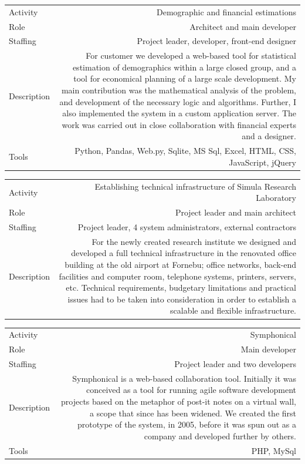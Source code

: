 \documentclass[english,a4paper,11pt]{article}
\begin{document}
\begin{tabular}{@{}LR}
Activity & Demographic and financial estimations \\ 
Role & Architect and main developer \\ 
Staffing & Project leader, developer, front-end designer \\ 
Description & For customer we developed a web-based tool for statistical estimation of demographics within a large closed group, and a tool for economical planning of a large scale development. My main contribution was the mathematical analysis of the problem, and development of the necessary logic and algorithms. Further, I also implemented the system in a custom application server. The work was carried out in close collaboration with financial experts and a designer. \\ 
Tools & Python, Pandas, Web.py, Sqlite, MS Sql, Excel, HTML, CSS, JavaScript, jQuery \\ 
\end{tabular}

\begin{tabular}{@{}LR}
Activity & Establishing technical infrastructure of Simula Research Laboratory \\ 
Role & Project leader and main architect \\ 
Staffing & Project leader, 4 system administrators, external contractors \\ 
Description & For the newly created research institute we designed and developed a full technical infrastructure in the renovated office building at the old airport at Fornebu; office networks, back-end facilities and computer room, telephone systems, printers, servers, etc. Technical requirements, budgetary limitations and practical issues had to be taken into consideration in order to establish a scalable and flexible infrastructure. \\ 
\end{tabular}

\begin{tabular}{@{}LR}
Activity & Symphonical \\ 
Role & Main developer \\ 
Staffing & Project leader and two developers \\ 
Description & Symphonical is a web-based collaboration tool. Initially it was conceived as a tool for running agile software development projects based on the metaphor of post-it notes on a virtual wall, a scope that since has been widened. We created the first prototype of the system, in 2005, before it was spun out as a company and developed further by others. \\ 
Tools & PHP, MySql \\ 
\end{tabular}
\end{document}
